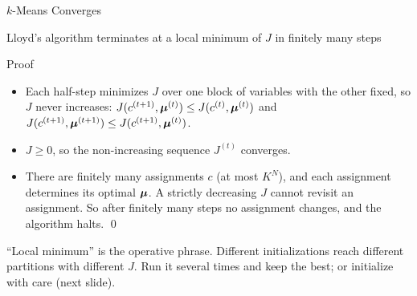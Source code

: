 \documentclass[11pt,aspectratio=169]{beamer}
\begin{document}
\begin{frame}{$k$-Means Converges}
\begin{claim}{Lloyd's algorithm terminates at a local minimum of $J$ in finitely many steps}
\end{claim}
\begin{derivation}{Proof}
\begin{itemize}
  \item Each half-step minimizes $J$ over one block of variables with the other fixed, so $J$ never increases:
        $J(c^{(t+1)},\boldsymbol{\mu}^{(t)})\le J(c^{(t)},\boldsymbol{\mu}^{(t)})$ and $J(c^{(t+1)},\boldsymbol{\mu}^{(t+1)})\le J(c^{(t+1)},\boldsymbol{\mu}^{(t)})$.
  \item $J\ge0$, so the non-increasing sequence $J^{(t)}$ converges.
  \item There are finitely many assignments $c$ (at most $K^N$), and each assignment determines its optimal $\boldsymbol{\mu}$.
        A strictly decreasing $J$ cannot revisit an assignment. So after finitely many steps no assignment changes,
        and the algorithm halts. \qed
\end{itemize}
\end{derivation}
\begin{caution}
``Local minimum'' is the operative phrase. Different initializations reach different partitions with
different $J$. Run it several times and keep the best; or initialize with care (next slide).
\end{caution}
\end{frame}
\end{document}
